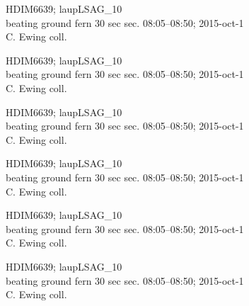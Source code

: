 \documentclass[2pt]{extarticle}
\begin{document}
\noindent
\parbox{0.16\textwidth}{\tiny \raggedright \rule[-0.3\baselineskip]{0pt}{10pt}HDIM6639; laupLSAG\_10\\ beating ground fern 30 sec sec. 08:05--08:50; 2015-oct-1\\ C. Ewing coll.}
\parbox{0.16\textwidth}{\tiny \raggedright \rule[-0.3\baselineskip]{0pt}{10pt}HDIM6639; laupLSAG\_10\\ beating ground fern 30 sec sec. 08:05--08:50; 2015-oct-1\\ C. Ewing coll.}
\parbox{0.16\textwidth}{\tiny \raggedright \rule[-0.3\baselineskip]{0pt}{10pt}HDIM6639; laupLSAG\_10\\ beating ground fern 30 sec sec. 08:05--08:50; 2015-oct-1\\ C. Ewing coll.}
\parbox{0.16\textwidth}{\tiny \raggedright \rule[-0.3\baselineskip]{0pt}{10pt}HDIM6639; laupLSAG\_10\\ beating ground fern 30 sec sec. 08:05--08:50; 2015-oct-1\\ C. Ewing coll.}
\parbox{0.16\textwidth}{\tiny \raggedright \rule[-0.3\baselineskip]{0pt}{10pt}HDIM6639; laupLSAG\_10\\ beating ground fern 30 sec sec. 08:05--08:50; 2015-oct-1\\ C. Ewing coll.}
\parbox{0.16\textwidth}{\tiny \raggedright \rule[-0.3\baselineskip]{0pt}{10pt}HDIM6639; laupLSAG\_10\\ beating ground fern 30 sec sec. 08:05--08:50; 2015-oct-1\\ C. Ewing coll.} \\ 
\vspace{0.001in} 
\end{document}
